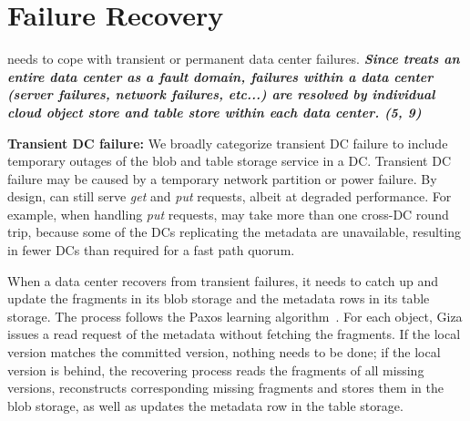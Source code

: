 \section{Failure Recovery}


\name needs to cope with transient or permanent data center failures. \textit{\textbf{Since \name treats an entire data center as a fault domain, failures within a data center (server failures, network failures, etc...) are resolved by individual cloud object store and table store within each data center. (5, 9)}}

{\bf Transient DC failure:}
We broadly categorize transient DC failure to include temporary outages of the blob
and table storage service in a DC. 
Transient DC failure may be caused by a temporary network partition or power failure.
By design, {\name} can still serve {\em get} and {\em put} requests, albeit at degraded performance. 
For example, when handling {\em put} requests,
\name may take more than one cross-DC round trip,
because some of the DCs replicating the metadata are unavailable,
resulting in fewer DCs than required for a fast path quorum.

When a data center recovers from transient failures,
it needs to catch up and update the fragments in its blob storage
and the metadata rows in its table storage. 
The process follows the Paxos learning algorithm~\cite{lamport01paxos}.
For each object, Giza issues a read request of the metadata without fetching the fragments.
If the local version matches the committed version, nothing needs to be done;
if the local version is behind,
the recovering process reads the fragments of all missing versions,
reconstructs corresponding missing fragments and stores them in the blob storage,
as well as updates the metadata row in the table storage.

